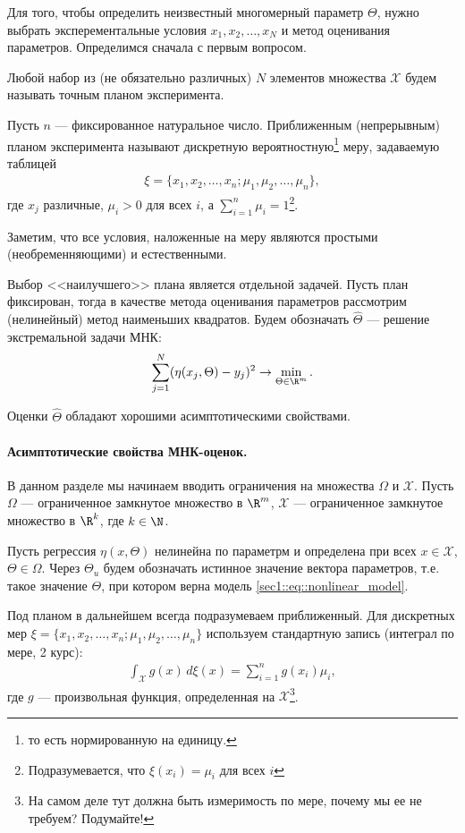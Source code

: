 Для того, чтобы определить неизвестный многомерный параметр $\Theta$, нужно выбрать эксперементальные условия $x_1, x_2, \ldots, x_N$ и метод
оценивания параметров. Определимся сначала с первым вопросом.
\begin{dfn}
    Любой набор из (не обязательно различных) $N$ элементов множества $\mathcal X$ будем называть точным планом эксперимента.
\end{dfn}
\begin{dfn}
    Пусть $n$ --- фиксированное натуральное число.
    Приближенным (непрерывным) планом эксперимента называют дискретную вероятностную\footnote{то есть нормированную на единицу.} меру, задаваемую таблицей
    \begin{gather}
        \xi = \{x_1, x_2, \ldots, x_n; \mu_1, \mu_2, \ldots, \mu_n\},
    \end{gather}
    где $x_j$ различные, $\mu_i > 0$ для всех $i$, а $\sum_{i=1}^n \mu_i = 1$\footnote{Подразумевается, что $\xi(x_i) = \mu_i$ для всех $i$}.
\end{dfn}
Заметим, что все условия, наложенные на меру являются простыми (необременняющими) и естественными.

Выбор <<наилучшего>> плана является отдельной задачей. Пусть план фиксирован, тогда в качестве метода оценивания параметров рассмотрим (нелинейный)
метод наименьших квадратов.
Будем обозначать $\hat \Theta$ --- решение экстремальной задачи МНК:
\begin{gather*}
    \sum_{j = 1}^N (\eta(x_j, \Theta) - y_j)^2 \to \min_{\Theta \in \R^m}.
\end{gather*}

Оценки $\hat \Theta$ обладают хорошими асимптотическими свойствами.

\paragraph{Асимптотические свойства МНК-оценок.}
В данном разделе мы начинаем вводить ограничения на множества $\Omega$ и $\mathcal X$.
Пусть $\Omega$ --- ограниченное замкнутое множество в $\R^m$, $\mathcal X$ --- ограниченное замкнутое множество в $\R^k$,
где $k \in \N$.

Пусть регрессия $\eta(x, \Theta)$ нелинейна по параметрм и определена при всех $x \in \mathcal X$, $\Theta \in \Omega$.
Через $\Theta_u$ будем обозначать истинное значение вектора параметров, т.е. такое значение $\Theta$, при котором верна модель
\eqref{sec1::eq::nonlinear_model}.

Под планом в дальнейшем всегда подразумеваем приближенный. Для дискретных мер $\xi = \{x_1, x_2, \ldots, x_n; \mu_1, \mu_2, \ldots, \mu_n\}$
используем стандартную запись (интеграл по мере, 2 курс):
\begin{gather*}
\int_\mathcal X g(x)\, d\xi(x) = \sum_{i = 1}^n g(x_i) \mu_i,
\end{gather*}
где $g$ --- произвольная функция, определенная на $\mathcal X$\footnote{На самом деле тут должна быть измеримость по мере, почему мы ее не требуем? Подумайте!}.

